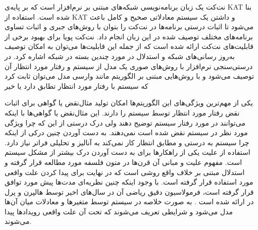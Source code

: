 نت‌کت
 \cite{netkat}
یک زبان برنامه‌نویسی شبکه‌های مبتنی بر نرم‌افزار است که بر پایه‌ی
KAT \cite{kat}
بنا شده است.
استفاده از 
KAT
و داشتن یک سیستم معادلاتی صحیح
و کامل
باعث می‌شود تا اثبات درستی برنامه‌ها در نت‌کت را بتوان با روش‌های جبری و اثبات تساوی برنامه‌های مختلف توصیف شده در این زبان انجام داد.
نت‌کت پویا
\cite{dynetkat}
برای بهبود برخی از قابلیت‌های نت‌کت ارائه شده است که از جمله این قابلیت‌ها می‌توان به امکان توصیف به‌روز رسانی‌های شبکه و استدلال در مورد چندین بسته در شبکه اشاره کرد.
در درستی‌سنجی نرم‌افزار با روش‌های صوری یک مدل از سیستم و رفتار مورد انتظار آن توصیف می‌شود و با روش‌هایی مبتنی بر الگوریتم مانند وارسی مدل
 \cite{clarke1997model}
می‌توان ثابت کرد که سیستم با رفتار مورد انتظار تطابق دارد یا خیر

یکی از مهم‌ترین ویژگی‌های این الگوریتم‌ها امکان تولید مثال‌نقض
یا گواهی
برای اثبات نقض رفتار مورد انتظار توسط سیستم را دارند.
این مثال‌نقض‌ یا گواهی‌ها با اینکه می‌توانند در مورد رفتار سیستم توضیح دهند ولی درک درستی از این که چرا ویژگی مورد نظر در سیستم نقض شده است نمی‌دهند.
به دست آوردن چنین درکی از اینکه چرا سیستم به درستی و مطابق انتظار کار نمی‌کند به آنالیز و تحلیلی فراتر نیاز دارد.
استفاده از علیت
یکی از راهکار‌ها برای به دست آوردن درک بیشتر از مشکل سیستم است.
مفهوم علیت و مبانی آن قرن‌ها در متون فلسفه مورد مطالعه قرار گرفته و استدلال مبتنی بر خلاف واقع روشی است که در نهایت برای پیدا کردن علت واقعی مورد استفاده قرار گرفته است.
با وجود اینکه چنین نظریه‌ای مدت‌ها پیش مورد توافق قرار گرفته است، فرمولاسیون دقیق ریاضی آن در سال‌های اخیر توسط هالپرن
و پرل
در 
\cite{hp}
ارائه شده است \cite{explications}.
به صورت خلاصه در 
\cite{hp}
سیستم توسط متغیر‌ها و معادلات میان آن‌ها مدل می‌شود و شرایطی تعریف می‌شوند که تحت آن علت واقعی رویداد‌ها پیدا می‌شوند.
 

